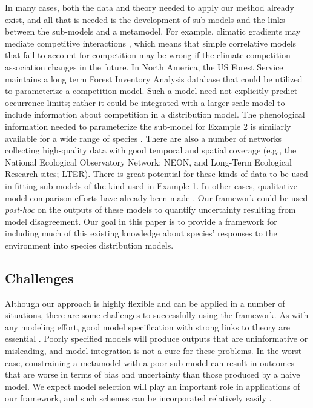 \documentclass[11pt]{article}
\begin{document}
In many cases, both the data and theory needed to apply our method already exist, and all that is needed is the development of sub-models and the links between the sub-models and a metamodel.
For example, climatic gradients may mediate competitive interactions \citep{Kunstler2011}, which means that simple correlative models that fail to account for competition may be wrong if the climate-competition association changes in the future.
In North America, the US Forest Service maintains a long term Forest Inventory Analysis database that could be utilized to parameterize a competition model.
Such a model need not explicitly predict occurrence limits; rather it could be integrated with a larger-scale model to include information about competition in a distribution model.
The phenological information needed to parameterize the sub-model for Example 2 is similarly available for a wide range of species \citep{Morin2009}.
There are also a number of networks collecting high-quality data with good temporal and spatial coverage (e.g., the National Ecological Observatory Network; NEON, and Long-Term Ecological Research sites; LTER).
There is great potential for these kinds of data to be used in fitting sub-models of the kind used in Example 1.
In other cases, qualitative model comparison efforts have already been made \citep{Morin2009, Cheaib2012}.
Our framework could be used \emph{post-hoc} on the outputs of these models to quantify uncertainty resulting from model disagreement.
Our goal in this paper is to provide a framework for including much of this existing knowledge about species' responses to the environment into species distribution models.


\subsection*{Challenges} 
Although our approach is highly flexible and can be applied in a number of situations, there are some challenges to successfully using the framework.
As with any modeling effort, good model specification with strong links to theory are essential \citep{Austin2007}.
Poorly specified models will produce outputs that are uninformative or misleading, and model integration is not a cure for these problems.
In the worst case, constraining a metamodel with a poor sub-model can result in outcomes that are worse in terms of bias and uncertainty than those produced by a naive model.
We expect model selection will play an important role in applications of our framework, and such schemes can be incorporated relatively easily \citep{Madigan1995, Wasserman2000, Tenan2014}.
\end{document}
